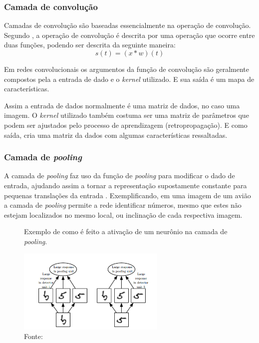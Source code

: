 \subsubsection{Camada de convolução}
Camadas de convolução são baseadas essencialmente na operação de convolução. Segundo \cite{Goodfellow-et-al-2016}, a operação de convolução é descrita por uma operação que ocorre entre duas funções, podendo ser descrita da seguinte maneira:\[s(t) = (x*w)(t)\]


Em redes convolucionais os argumentos da função de convolução são geralmente compostos pela a entrada de dado e o \textit{kernel} utilizado. E sua saída é um mapa de características.
\par Assim a entrada de dados normalmente é uma matriz de dados, no caso uma imagem. O \textit{kernel} utilizado também costuma ser uma matriz de parâmetros que podem ser ajustados pelo processo de aprendizagem (retropropagação). E como saída, cria uma matriz da dados com algumas características ressaltadas.
\subsubsection{Camada de \textit{pooling}}
A camada de \textit{pooling} faz uso da função de \textit{pooling} para modificar o dado de entrada, ajudando assim a tornar a representação supostamente constante para pequenas translações da entrada \cite{Goodfellow-et-al-2016}. Exemplificando, em uma imagem de um avião a camada de \textit{pooling} permite a rede identificar números, mesmo que estes não estejam localizados no mesmo local, ou inclinação de cada respectiva imagem.
\begin{figure}[H]
  \centering
  \caption{Exemplo de como é feito a ativação de um neurônio na camada de \textit{pooling}.}
  \includegraphics[width=200pt]{dados/figuras/pooling}
  \caption*{Fonte: \cite{Goodfellow-et-al-2016}}
  \label{fig:retroalimentacao}
\end{figure}

